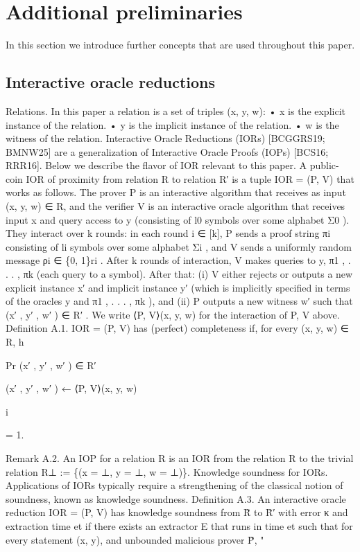\documentclass[11pt]{article}
\begin{document}
\appendix
\section{Additional preliminaries}



In this section we introduce further concepts that are used throughout this paper.


\subsection{Interactive oracle reductions}



Relations. In this paper a relation is a set of triples (x, y, w):
• x is the explicit instance of the relation.
• y is the implicit instance of the relation.
• w is the witness of the relation.
Interactive Oracle Reductions (IORs) [BCGGRS19; BMNW25] are a generalization of Interactive Oracle Proofs (IOPs) [BCS16; RRR16]. Below we describe the flavor of IOR relevant to this
paper.
A public-coin IOR of proximity from relation R to relation R′ is a tuple IOR = (P, V) that works
as follows. The prover P is an interactive algorithm that receives as input (x, y, w) ∈ R, and the
verifier V is an interactive oracle algorithm that receives input x and query access to y (consisting
of l0 symbols over some alphabet Σ0 ). They interact over k rounds: in each round i ∈ [k], P sends
a proof string πi consisting of li symbols over some alphabet Σi , and V sends a uniformly random
message ρi ∈ \{0, 1\}ri . After k rounds of interaction, V makes queries to y, π1 , . . . , πk (each query
to a symbol). After that: (i) V either rejects or outputs a new explicit instance x′ and implicit
instance y′ (which is implicitly specified in terms of the oracles y and π1 , . . . , πk ), and (ii) P outputs
a new witness w′ such that (x′ , y′ , w′ ) ∈ R′ . We write ⟨P, V⟩(x, y, w) for the interaction of P, V
above.
Definition A.1. IOR = (P, V) has (perfect) completeness if, for every (x, y, w) ∈ R,
h

Pr (x′ , y′ , w′ ) ∈ R′

(x′ , y′ , w′ ) ← ⟨P, V⟩(x, y, w)

i

= 1.

Remark A.2. An IOP for a relation R is an IOR from the relation R to the trivial relation
R⊥ := \{(x = ⊥, y = ⊥, w = ⊥)\}.
Knowledge soundness for IORs. Applications of IORs typically require a strengthening of the
classical notion of soundness, known as knowledge soundness.
Definition A.3. An interactive oracle reduction IOR = (P, V) has knowledge soundness from
R̃ to R̃′ with error κ and extraction time et if there exists an extractor E that runs in time
et such that for every statement (x, y), and unbounded malicious prover P̃,
"
\end{document}
